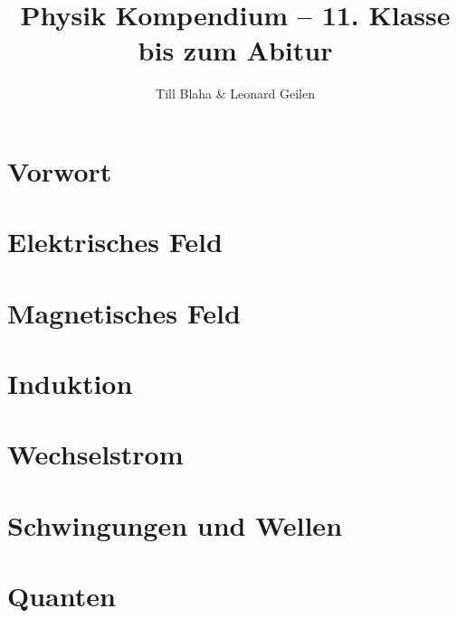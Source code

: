 \documentclass[a4paper, 11pt]{book}
\title{Physik Kompendium -- 11. Klasse bis zum Abitur}
\author{Till Blaha \& Leonard Geilen}
\begin{document}
\maketitle
\tableofcontents
\newpage


\chapter*{Vorwort}


\chapter{Elektrisches Feld}


\chapter{Magnetisches Feld}


\chapter{Induktion}


\chapter{Wechselstrom}


\chapter{Schwingungen und Wellen}


\chapter{Quanten}



%	
\end{document}
